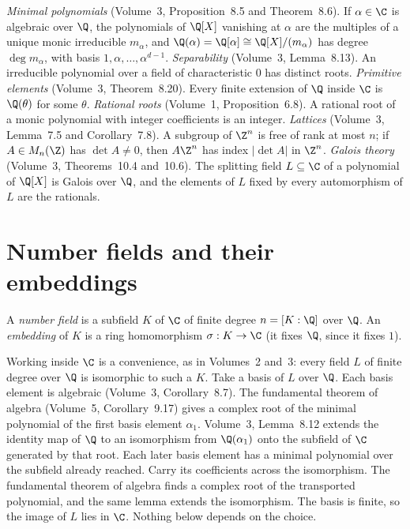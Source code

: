 \begin{reminder}
\emph{Minimal polynomials} (Volume~3, Proposition~8.5 and Theorem~8.6). If $\alpha\in\C$ is algebraic over $\Q$, the
polynomials of $\Q[X]$ vanishing at $\alpha$ are the multiples of a unique monic irreducible $m_\alpha$, and
$\Q(\alpha)=\Q[\alpha]\cong\Q[X]/(m_\alpha)$ has degree $\deg m_\alpha$, with basis $1,\alpha,\dots,\alpha^{d-1}$.
\emph{Separability} (Volume~3, Lemma~8.13). An irreducible polynomial over a field of characteristic $0$ has distinct
roots. \emph{Primitive elements} (Volume~3, Theorem~8.20). Every finite extension of $\Q$ inside $\C$ is $\Q(\theta)$
for some $\theta$. \emph{Rational roots} (Volume~1, Proposition~6.8). A rational root of a monic polynomial with
integer coefficients is an integer. \emph{Lattices} (Volume~3, Lemma~7.5 and Corollary~7.8). A subgroup of $\Z^n$ is free
of rank at most $n$; if $A\in M_n(\Z)$ has $\det A\ne0$, then $A\Z^n$ has index $|\det A|$ in $\Z^n$. \emph{Galois
theory} (Volume~3, Theorems~10.4 and~10.6). The splitting field $L\subseteq\C$ of a polynomial of $\Q[X]$ is Galois over
$\Q$, and the elements of $L$ fixed by every automorphism of $L$ are the rationals.
\end{reminder}

\section{Number fields and their embeddings}

\begin{definition}
A \emph{number field} is a subfield $K$ of $\C$ of finite degree $n=[K:\Q]$ over $\Q$. An \emph{embedding} of $K$ is
a ring homomorphism $\sigma:K\to\C$ (it fixes $\Q$, since it fixes $1$).
\end{definition}

Working inside $\C$ is a convenience, as in Volumes~2 and~3: every field $L$ of finite degree over $\Q$ is isomorphic to
such a $K$. Take a basis of $L$ over $\Q$. Each basis element is algebraic (Volume~3, Corollary~8.7). The fundamental
theorem of algebra (Volume~5, Corollary~9.17) gives a complex root of the minimal polynomial of the first basis
element $\alpha_1$. Volume~3, Lemma~8.12 extends the identity map of $\Q$ to an isomorphism from $\Q(\alpha_1)$ onto
the subfield of $\C$ generated by that root. Each later basis element has a minimal polynomial over the subfield
already reached. Carry its coefficients across the isomorphism. The fundamental theorem of algebra finds a
complex root of the transported polynomial, and the same lemma extends the isomorphism. The basis is finite, so the image of $L$ lies in $\C$. Nothing
below depends on the choice.

